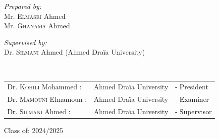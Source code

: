 \documentclass[a4paper,12pt]{report}
\begin{document}
\begin{titlepage}
		\noindent
		\begin{minipage}{0.5\textwidth}
			\vspace{-7mm}
			\begin{flushleft} \large
				\emph{Prepared by:}\\
				Mr. \textsc{Elmasri} Ahmed \\
				Mr. \textsc{Ghanama} Ahmed \\
			\end{flushleft}
		\end{minipage}
		\begin{minipage}{0.4\textwidth}
			\begin{flushright} \large
				\begin{flushleft} \large
					\emph{Supervised by:} \\
					Dr. \textsc{Silmani} Ahmed (Ahmed Draïa University)\\[0.1cm]
				\end{flushleft}
			\end{flushright}
		\end{minipage}\\[1cm]
		
		\begin{tabular}{lll}
			\large Dr. \textsc{Kohili} Mohammed : & \large Ahmed Draïa University & \large - President \\[0.1cm]
			\large Dr. \textsc{Mamouni} Elmamoun : & \large Ahmed Draïa University & \large - Examiner \\[0.1cm]
			\large Dr. \textsc{Silmani} Ahmed : & \large Ahmed Draïa University & \large - Supervisor
		\end{tabular}	
		\vspace{10mm}
		{\large Class of: 2024/2025}
		
	\end{titlepage}
\end{document}
